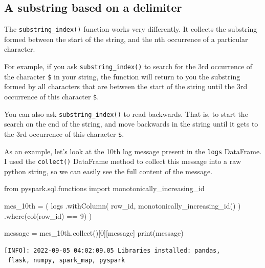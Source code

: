 \documentclass[
  11pt,
  letterpaper,
  DIV=11,
  numbers=noendperiod]{scrreprt}
\newenvironment{Shaded}{\begin{snugshade}}{\end{snugshade}}
\newcommand{\BuiltInTok}[1]{\textcolor[rgb]{0.00,0.23,0.31}{#1}}
\newcommand{\DecValTok}[1]{\textcolor[rgb]{0.68,0.00,0.00}{#1}}
\newcommand{\ImportTok}[1]{\textcolor[rgb]{0.00,0.46,0.62}{#1}}
\newcommand{\NormalTok}[1]{\textcolor[rgb]{0.00,0.23,0.31}{#1}}
\newcommand{\OperatorTok}[1]{\textcolor[rgb]{0.37,0.37,0.37}{#1}}
\newcommand{\StringTok}[1]{\textcolor[rgb]{0.13,0.47,0.30}{#1}}
\begin{document}
\subsection{A substring based on a
delimiter}\label{a-substring-based-on-a-delimiter}

The \texttt{substring\_index()} function works very differently. It
collects the substring formed between the start of the string, and the
nth occurrence of a particular character.

For example, if you ask \texttt{substring\_index()} to search for the
3rd occurrence of the character \texttt{\$} in your string, the function
will return to you the substring formed by all characters that are
between the start of the string until the 3rd occurrence of this
character \texttt{\$}.

You can also ask \texttt{substring\_index()} to read backwards. That is,
to start the search on the end of the string, and move backwards in the
string until it gets to the 3rd occurrence of this character
\texttt{\$}.

As an example, let's look at the 10th log message present in the
\texttt{logs} DataFrame. I used the \texttt{collect()} DataFrame method
to collect this message into a raw python string, so we can easily see
the full content of the message.

\begin{Shaded}
\begin{Highlighting}[]
\ImportTok{from}\NormalTok{ pyspark.sql.functions }\ImportTok{import}\NormalTok{ monotonically\_increasing\_id}

\NormalTok{mes\_10th }\OperatorTok{=}\NormalTok{ (}
\NormalTok{    logs}
\NormalTok{    .withColumn(}
        \StringTok{\textquotesingle{}row\_id\textquotesingle{}}\NormalTok{,}
\NormalTok{        monotonically\_increasing\_id()}
\NormalTok{    )}
\NormalTok{    .where(col(}\StringTok{\textquotesingle{}row\_id\textquotesingle{}}\NormalTok{) }\OperatorTok{==} \DecValTok{9}\NormalTok{)}
\NormalTok{)}

\NormalTok{message }\OperatorTok{=}\NormalTok{ mes\_10th.collect()[}\DecValTok{0}\NormalTok{][}\StringTok{\textquotesingle{}message\textquotesingle{}}\NormalTok{]}
\BuiltInTok{print}\NormalTok{(message)}
\end{Highlighting}
\end{Shaded}

\begin{verbatim}
[INFO]: 2022-09-05 04:02:09.05 Libraries installed: pandas, 
 flask, numpy, spark_map, pyspark
\end{verbatim}
\end{document}
